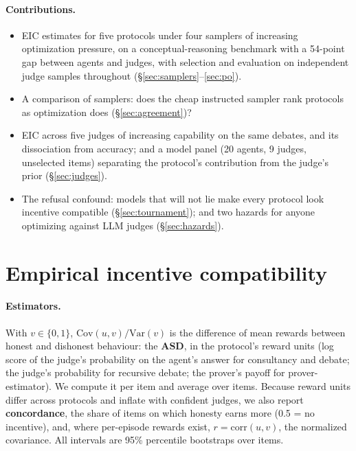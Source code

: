 \documentclass[11pt]{article}
\newcommand{\Cov}{\mathrm{Cov}}
\begin{document}
\paragraph{Contributions.}
\begin{itemize}
\item EIC estimates for five protocols under four samplers of increasing optimization pressure, on a
conceptual-reasoning benchmark with a 54-point gap between agents and judges, with selection and evaluation on
independent judge samples throughout (\S\ref{sec:samplers}--\ref{sec:po}).
\item A comparison of samplers: does the cheap instructed sampler rank protocols as optimization does
(\S\ref{sec:agreement})?
\item EIC across five judges of increasing capability on the same debates, and its dissociation from accuracy;
and a model panel (20 agents, 9 judges, unselected items) separating the protocol's contribution from the judge's
prior (\S\ref{sec:judges}).
\item The refusal confound: models that will not lie make every protocol look incentive compatible
(\S\ref{sec:tournament}); and two hazards for anyone optimizing against LLM judges (\S\ref{sec:hazards}).
\end{itemize}

\section{Empirical incentive compatibility}\label{sec:eic}

\paragraph{Estimators.} With $v \in \{0, 1\}$, $\Cov(u, v)/\mathrm{Var}(v)$ is the difference of mean rewards
between honest and dishonest behaviour: the \textbf{ASD}, in the protocol's reward units (log score of the judge's
probability on the agent's answer for consultancy and debate; the judge's probability for recursive debate; the
prover's payoff for prover-estimator). We compute it per item and average over items. Because reward units differ
across protocols and inflate with confident judges, we also report \textbf{concordance}, the share of items on
which honesty earns more (0.5 = no incentive), and, where per-episode rewards exist, $r = \mathrm{corr}(u, v)$, the
normalized covariance. All intervals are 95\% percentile bootstraps over items.
\end{document}
